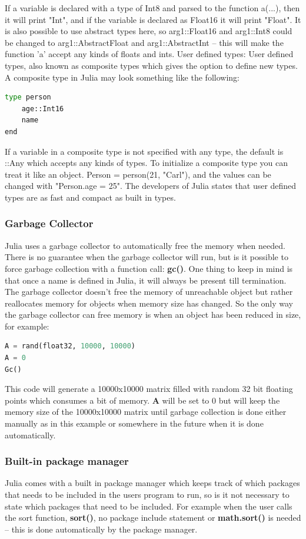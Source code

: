 \documentclass[a4paper,11pt]{article}
\begin{document}
If a variable is declared with a type of Int8 and parsed to the function a(...), then it will print "Int", and if the variable is declared as Float16 it will print "Float". It is also possible to use abstract types here, so arg1::Float16 and arg1::Int8 could be changed to arg1::AbstractFloat and arg1::AbstractInt – this will make the function 'a' accept any kinds of floats and ints.  
User defined types: User defined types, also known as composite types which gives the option to define new types. A composite type in Julia may look something like the following: 
\begin{lstlisting}[language=python]
type person 
	age::Int16 
	name 
end    
\end{lstlisting}
If a variable in a composite type is not specified with any type, the default is ::Any which accepts any kinds of types. To initialize a composite type you can treat it like an object. Person = person(21, "Carl"), and the values can be changed with "Person.age = 25". The developers of Julia states that user defined types are as fast and compact as built in types. 

\subsubsection{Garbage Collector}
Julia uses a garbage collector to automatically free the memory when needed. There is no guarantee when the garbage collector will run, but is it possible to force garbage collection with a function call: \textbf{gc()}. One thing to keep in mind is that once a name is defined in Julia, it will always be present till termination. The garbage collector doesn't free the memory of unreachable object but rather reallocates memory for objects when memory size has changed. So the only way the garbage collector can free memory is when an object has been reduced in size, for example:

\begin{lstlisting}[language=python]
A = rand(float32, 10000, 10000) 
A = 0
Gc() 
\end{lstlisting}
This code will generate a 10000x10000 matrix filled with random 32 bit floating points which consumes a bit of memory. \textbf{A} will be set to 0 but will keep the memory size of the 10000x10000 matrix until garbage collection is done either manually as in this example or somewhere in the future when it is done automatically. 

\subsubsection{Built-in package manager}
Julia comes with a built in package manager which keeps track of which packages that needs to be included in the users program to run, so is it not necessary to state which packages that need to be included. For example when the user calls the sort function, \textbf{sort()}, no package include statement or \textbf{math.sort()} is needed – this is done automatically by the package manager.
\end{document}
